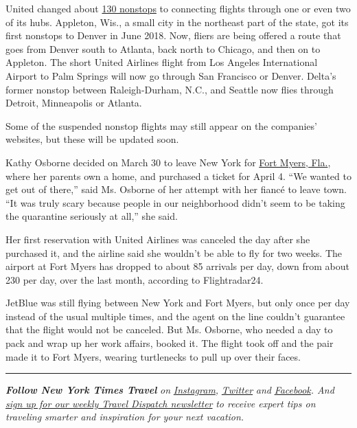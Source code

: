 United changed about
\href{https://hub.united.com/united-flight-reductions-suspensions-2020-2645514815.html}{130
nonstops} to connecting flights through one or even two of its hubs.
Appleton, Wis., a small city in the northeast part of the state, got its
first nonstops to Denver in June 2018. Now, fliers are being offered a
route that goes from Denver south to Atlanta, back north to Chicago, and
then on to Appleton. The short United Airlines flight from Los Angeles
International Airport to Palm Springs will now go through San Francisco
or Denver. Delta's former nonstop between Raleigh-Durham, N.C., and
Seattle now flies through Detroit, Minneapolis or Atlanta.

Some of the suspended nonstop flights may still appear on the companies'
websites, but these will be updated soon.

Kathy Osborne decided on March 30 to leave New York for
\href{https://www.cityftmyers.com/}{Fort Myers, Fla.}, where her parents
own a home, and purchased a ticket for April 4. ``We wanted to get out
of there,'' said Ms. Osborne of her attempt with her fiancé to leave
town. ``It was truly scary because people in our neighborhood didn't
seem to be taking the quarantine seriously at all,'' she said.

Her first reservation with United Airlines was canceled the day after
she purchased it, and the airline said she wouldn't be able to fly for
two weeks. The airport at Fort Myers has dropped to about 85 arrivals
per day, down from about 230 per day, over the last month, according to
Flightradar24.

JetBlue was still flying between New York and Fort Myers, but only once
per day instead of the usual multiple times, and the agent on the line
couldn't guarantee that the flight would not be canceled. But Ms.
Osborne, who needed a day to pack and wrap up her work affairs, booked
it. The flight took off and the pair made it to Fort Myers, wearing
turtlenecks to pull up over their faces.

\begin{center}\rule{0.5\linewidth}{\linethickness}\end{center}

\emph{\textbf{Follow New York Times Travel}} \emph{on}
\href{https://www.instagram.com/nytimestravel/}{\emph{Instagram}}\emph{,}
\href{https://twitter.com/nytimestravel}{\emph{Twitter}} \emph{and}
\href{https://www.facebookcorewwwi.onion/nytimestravel/}{\emph{Facebook}}\emph{.
And}
\href{https://www.nytimes3xbfgragh.onion/newsletters/traveldispatch}{\emph{sign
up for our weekly Travel Dispatch newsletter}} \emph{to receive expert
tips on traveling smarter and inspiration for your next vacation.}

